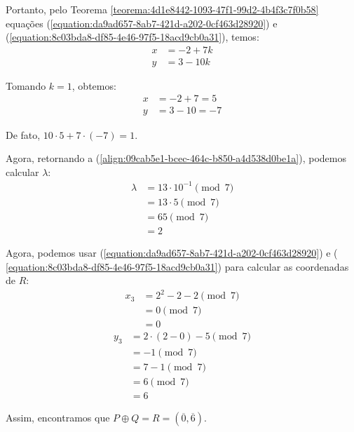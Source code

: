 \begin{exemplo}
	\justify
	Portanto, pelo Teorema \ref{teorema:4d1e8442-1093-47f1-99d2-4b4f3c7f0b58} equações (\ref{equation:da9ad657-8ab7-421d-a202-0cf463d28920}) e (\ref{equation:8c03bda8-df85-4e46-97f5-18acd9cb0a31}), temos:
	\begin{align}
		x & = -2 + 7k \nonumber \\
		y & = 3 - 10k \nonumber
	\end{align}

	\justify
	Tomando $k = 1$, obtemos:
	\begin{align}
		x & = -2 + 7 = 5 \nonumber  \\
		y & = 3 - 10 = -7 \nonumber
	\end{align}

	\justify
	De fato, $10 \cdot 5 + 7 \cdot (-7) = 1$.

	\justify
	Agora, retornando a (\ref{align:09cab5e1-bcec-464c-b850-a4d538d0be1a}), podemos calcular $\lambda$:
	\begin{align}
		\lambda & = 13\cdot10^{-1} \pmod{7}\nonumber  \\
		        & = 13\cdot5 \pmod{7}       \nonumber \\
		        & = 65 \pmod{7}            \nonumber  \\
		        & = 2\nonumber
	\end{align}

	\justify
	Agora, podemos usar (\ref{equation:da9ad657-8ab7-421d-a202-0cf463d28920}) e ( \ref{equation:8c03bda8-df85-4e46-97f5-18acd9cb0a31}) para calcular as coordenadas de $R$:
	\begin{align}
		x_3 & = 2^2 - 2 - 2 \pmod{7} \nonumber \\
		    & = 0 \pmod{7}           \nonumber \\
		    & = 0 \nonumber
	\end{align}
	\begin{align}
		y_3 & = 2 \cdot (2 - 0) - 5 \pmod{7}\nonumber \\
		    & = -1 \pmod{7}                \nonumber  \\
		    & = 7 - 1 \pmod{7}              \nonumber \\
		    & = 6 \pmod{7}                 \nonumber  \\
		    & = 6 \nonumber
	\end{align}

	\justify
	Assim, encontramos que $P \oplus Q = R = (\overline{0}, \overline{6})$.
\end{exemplo}

